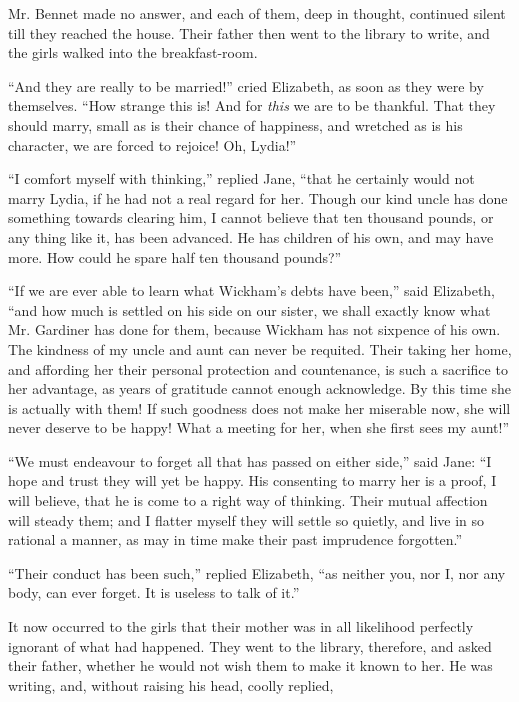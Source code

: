 Mr. Bennet made no answer, and each of them, deep
in thought, continued silent till they reached the house.
Their father then went to the library to write, and the
girls walked into the breakfast-room.

“And they are really to be married!” cried Elizabeth,
as soon as they were by themselves. “How strange this
is! And for \textit{this} we are to be thankful. That they should
marry, small as is their chance of happiness, and wretched
as is his character, we are forced to rejoice! Oh, Lydia!”

“I comfort myself with thinking,” replied Jane, “that
he certainly would not marry Lydia, if he had not a real
regard for her. Though our kind uncle has done something
towards clearing him, I cannot believe that ten thousand
pounds, or any thing like it, has been advanced. He has
children of his own, and may have more. How could he
spare half ten thousand pounds?”

“If we are ever able to learn what Wickham’s debts
have been,” said Elizabeth, “and how much is settled on his
side on our sister, we shall exactly know what Mr. Gardiner
has done for them, because Wickham has not sixpence
of his own. The kindness of my uncle and aunt can never
be requited. Their taking her home, and affording her
their personal protection and countenance, is such a
sacrifice to her advantage, as years of gratitude cannot
enough acknowledge. By this time she is actually with
them! If such goodness does not make her miserable
now, she will never deserve to be happy! What a meeting
for her, when she first sees my aunt!”

“We must endeavour to forget all that has passed on
either side,” said Jane: “I hope and trust they will yet
be happy. His consenting to marry her is a proof, I will
believe, that he is come to a right way of thinking. Their
mutual affection will steady them; and I flatter myself
they will settle so quietly, and live in so rational a manner,
as may in time make their past imprudence forgotten.”

“Their conduct has been such,” replied Elizabeth, “as
neither you, nor I, nor any body, can ever forget. It is
useless to talk of it.”

It now occurred to the girls that their mother was in
all likelihood perfectly ignorant of what had happened.
They went to the library, therefore, and asked their father,
whether he would not wish them to make it known to
her. He was writing, and, without raising his head, coolly
replied,

